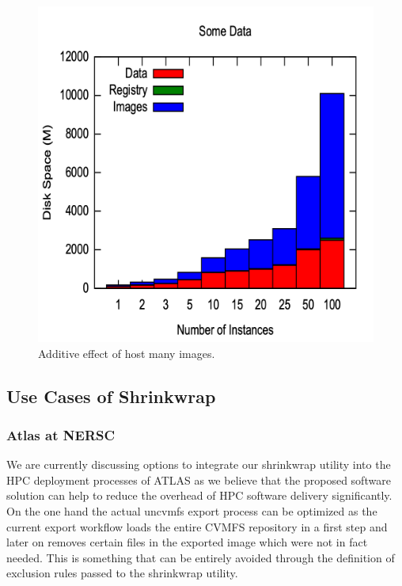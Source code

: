 \documentclass[conference]{IEEEtran}
\begin{document}
\begin{figure}[h]
\includegraphics[width=\columnwidth]{plots/specification_size.png}
\caption{Additive effect of host many images.}
\label{figure:spec-size}
\end{figure}

\subsection{Use Cases of Shrinkwrap}

\subsubsection{Atlas at NERSC}

We are currently discussing options to integrate our shrinkwrap utility into the HPC deployment processes of ATLAS as we believe that the proposed software solution can help to reduce the overhead of HPC software delivery significantly. On the one hand the actual uncvmfs export process can be optimized as the current export workflow loads the entire CVMFS repository in a first step and later on removes certain files in the exported image which were not in fact needed. This is something that can be entirely avoided through the definition of exclusion rules passed to the shrinkwrap utility.
\end{document}
